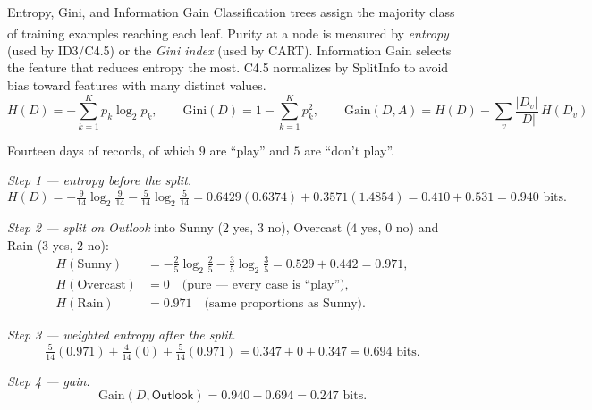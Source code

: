 \begin{v3topic}{Entropy, Gini, and Information Gain}
    Classification trees assign the majority class of training examples reaching each leaf\textsuperscript{\cite[][pp.~330--344]{hanDataMiningConcepts2012}}. Purity at a node is measured by \emph{entropy} (used by ID3/C4.5) or the \emph{Gini index} (used by CART). Information Gain selects the feature that reduces entropy the most. C4.5 normalizes by SplitInfo to avoid bias toward features with many distinct values.
\visualseparator
    \begin{equation}
        H(D) = -\sum_{k=1}^{K} p_k \log_2 p_k,
        \qquad
        \text{Gini}(D) = 1 - \sum_{k=1}^{K} p_k^2,
        \qquad
        \text{Gain}(D,A) = H(D) - \sum_{v} \frac{|D_v|}{|D|}\,H(D_v)
        \label{eq:ml-information-gain}
    \end{equation}

\begin{workedexample}
Fourteen days of records, of which $9$ are ``play'' and $5$ are ``don't play''.

\emph{Step 1 --- entropy before the split.}
\[
  H(D) = -\tfrac{9}{14}\log_2\tfrac{9}{14} - \tfrac{5}{14}\log_2\tfrac{5}{14}
       = 0.6429(0.6374) + 0.3571(1.4854)
       = 0.410 + 0.531 = 0.940 \text{ bits.}
\]

\emph{Step 2 --- split on \textsf{Outlook}} into Sunny ($2$ yes, $3$ no),
Overcast ($4$ yes, $0$ no) and Rain ($3$ yes, $2$ no):
\[
\begin{aligned}
  H(\text{Sunny}) &= -\tfrac{2}{5}\log_2\tfrac{2}{5}
    -\tfrac{3}{5}\log_2\tfrac{3}{5} = 0.529 + 0.442 = 0.971,\\
  H(\text{Overcast}) &= 0 \quad\text{(pure --- every case is ``play'')},\\
  H(\text{Rain}) &= 0.971 \quad\text{(same proportions as Sunny)} .
\end{aligned}
\]

\emph{Step 3 --- weighted entropy after the split.}
\[
  \tfrac{5}{14}(0.971) + \tfrac{4}{14}(0) + \tfrac{5}{14}(0.971)
  = 0.347 + 0 + 0.347 = 0.694 \text{ bits.}
\]

\emph{Step 4 --- gain.}
\[
  \text{Gain}(D,\textsf{Outlook}) = 0.940 - 0.694 = \mathbf{0.247} \text{ bits.}
\]


\end{workedexample}
\end{v3topic}
